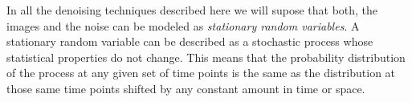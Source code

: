 In all the denoising techniques described here we will supose that
both, the images and the noise can be modeled as \emph{stationary
  random variables}. A stationary random variable can be described as
a stochastic process whose statistical properties do not change. This
means that the probability distribution of the process at any given
set of time points is the same as the distribution at those same time
points shifted by any constant amount in time or space.



